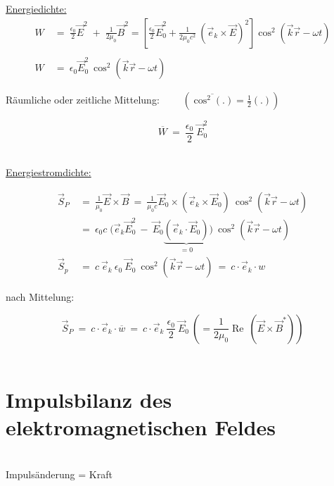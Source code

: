 \underline{Energiedichte:}\\

\begin{align*}
W \ &= \ \frac{\epsilon_0}{2} \vec{E}^2 \; + \; \frac{1}{2\mu_0}\vec{B}^2 = \left[\frac{\epsilon_0}{2}\vec{E}_0^2 + \frac{1}{2\mu_0 c^2} \ \left(\vec{e}_k\times\vec{E}\right)^2\right] \cos^2\left(\vec{k}\vec{r}-\omega t\right)\\
\ \\
W \ &= \ \epsilon_0 \vec{E}_0^2 \ \cos^2\left(\vec{k}\vec{r}-\omega t\right)
\end{align*}

Räumliche oder zeitliche Mittelung: $\qquad\left(\overline{\cos^2(.)} = \frac{1}{2}(.)\right)$

\begin{equation*}
\overline{W} \ = \ \frac{\epsilon_0}{2} \ \vec{E}_0^2
\end{equation*}

\ \\
\underline{Energiestromdichte:}

\begin{align*}
\vec{S}_P \ &= \ \frac{1}{\mu_0} \vec{E}\times\vec{B} \ = \ \frac{1}{\mu_0 c} \vec{E}_0 \times \left(\vec{e}_k\times\vec{E}_0\right) \ \cos^2\left(\vec{k}\vec{r}-\omega t\right)\\
&= \ \epsilon_0 c \; \Bigg(\vec{e}_k\vec{E}_0^2 \ - \ \vec{E}_0\underbrace{\left(\vec{e}_k\cdot\vec{E}_0\right)}_{=0}\Bigg) \ \cos^2\left(\vec{k}\vec{r}-\omega t\right)\\
\vec{S}_p \ &= \ c \ \vec{e}_k \ \epsilon_0 \ \vec{E}_0 \ \cos^2 \left(\vec{k}\vec{r}-\omega t\right) \ = \ c \cdot  \vec{e}_k \cdot w
\end{align*}

nach Mittelung:

\begin{equation*}
\vec{S}_P \ = \ c \cdot \vec{e}_k \cdot \overline{w} \ = \ c \cdot \vec{e}_k \ \frac{\epsilon_0}{2} \ \vec{E}_0 \ \left( = \frac{1}{2\mu_0} \operatorname{Re} \ (\vec{E}\times\vec{B}^*)\right)
\end{equation*}
\ \\

\section{Impulsbilanz des elektromagnetischen Feldes}
\ \\
Impulsänderung = Kraft

